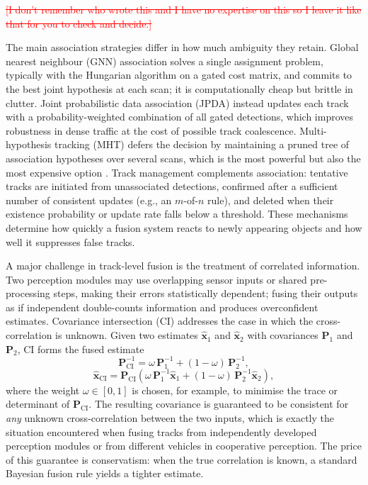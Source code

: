 \documentclass{ieeeaccess}
\newcommand{\deleted}[1]{\textcolor{red}{\sout{#1}}}
\begin{document}
\deleted{[I don't remember who wrote this and I have no expertise on this so I leave it like that for you to check and decide.]} %
{\color{blue}
The main association strategies differ in how much ambiguity they retain. Global nearest neighbour (GNN) association solves a single assignment problem, typically with the Hungarian algorithm on a gated cost matrix, and commits to the best joint hypothesis at each scan; it is computationally cheap but brittle in clutter. Joint probabilistic data association (JPDA) instead updates each track with a probability-weighted combination of all gated detections, which improves robustness in dense traffic at the cost of possible track coalescence. Multi-hypothesis tracking (MHT) defers the decision by maintaining a pruned tree of association hypotheses over several scans, which is the most powerful but also the most expensive option \cite{khaleghi_multisensor_2013,liggins_handbook_2009}. Track management complements association: tentative tracks are initiated from unassociated detections, confirmed after a sufficient number of consistent updates (e.g., an $m$-of-$n$ rule), and deleted when their existence probability or update rate falls below a threshold. These mechanisms determine how quickly a fusion system reacts to newly appearing objects and how well it suppresses false tracks.

A major challenge in track-level fusion is the treatment of correlated information. Two perception modules may use overlapping sensor inputs or shared pre-processing steps, making their errors statistically dependent; fusing their outputs as if independent double-counts information and produces overconfident estimates. Covariance intersection (CI) addresses the case in which the cross-correlation is unknown. Given two estimates $\widehat{\mathbf{x}}_1$ and $\widehat{\mathbf{x}}_2$ with covariances $\mathbf{P}_1$ and $\mathbf{P}_2$, CI forms the fused estimate
\begin{equation}
\mathbf{P}_{\mathrm{CI}}^{-1}=\omega\,\mathbf{P}_1^{-1}+(1-\omega)\,\mathbf{P}_2^{-1},
\label{eq:ci-cov}
\end{equation}
\begin{equation}
\widehat{\mathbf{x}}_{\mathrm{CI}}=\mathbf{P}_{\mathrm{CI}}\left(\omega\,\mathbf{P}_1^{-1}\widehat{\mathbf{x}}_1+(1-\omega)\,\mathbf{P}_2^{-1}\widehat{\mathbf{x}}_2\right),
\label{eq:ci-est}
\end{equation}
where the weight $\omega\in[0,1]$ is chosen, for example, to minimise the trace or determinant of $\mathbf{P}_{\mathrm{CI}}$. The resulting covariance is guaranteed to be consistent for \emph{any} unknown cross-correlation between the two inputs, which is exactly the situation encountered when fusing tracks from independently developed perception modules or from different vehicles in cooperative perception. The price of this guarantee is conservatism: when the true correlation is known, a standard Bayesian fusion rule yields a tighter estimate.
}
\end{document}
